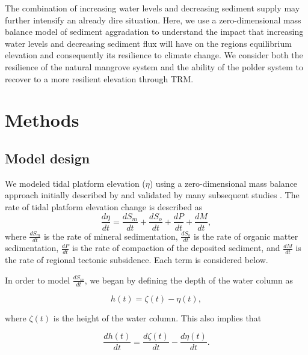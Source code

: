 \documentclass[a4paper,fleqn]{cas-dc}
\begin{document}
The combination of increasing water levels and decreasing sediment supply may further intensify an already dire situation. Here, we use a zero-dimensional mass balance model of sediment aggradation to understand the impact that increasing water levels and decreasing sediment flux will have on the regions equilibrium elevation and consequently its resilience to climate change. We consider both the resilience of the natural mangrove system and the ability of the polder system to recover to a more resilient elevation through TRM.

\section{Methods}

\subsection{Model design}

We modeled tidal platform elevation ($\eta$) using a zero-dimensional mass balance approach initially described by \citet{kroneMethodSimulatingMarsh1987} and validated by many subsequent studies \citep{allenSaltmarshGrowthStratification1990, frenchNumericalSimulationVertical1993, temmermanModellingLongtermTidal2003,temmermanModellingEstuarineVariations2004}. The rate of tidal platform elevation change is described as
\begin{equation}\label{eq1}
	\frac{d\eta}{dt} = \frac{dS_m}{dt} + \frac{dS_o}{dt} + \frac{dP}{dt} + \frac{dM}{dt},
\end{equation}
where $\frac{dS_m}{dt}$ is the rate of mineral sedimentation, $\frac{dS_o}{dt}$ is the rate of organic matter sedimentation, $\frac{dP}{dt}$ is the rate of compaction of the deposited sediment, and $\frac{dM}{dt}$ is the rate of regional tectonic subsidence. Each term is considered below.

In order to model $\frac{dS_m}{dt}$, we began by defining the depth of the water column as

\begin{equation}\label{eq2}
	h(t) = \zeta(t) - \eta(t),
\end{equation}

where $\zeta(t)$ is the height of the water column. This also implies that

\begin{equation}\label{eq3}
	\frac{dh(t)}{dt} = \frac{d\zeta(t)}{dt} - \frac{d\eta(t)}{dt}.
\end{equation}
\end{document}
